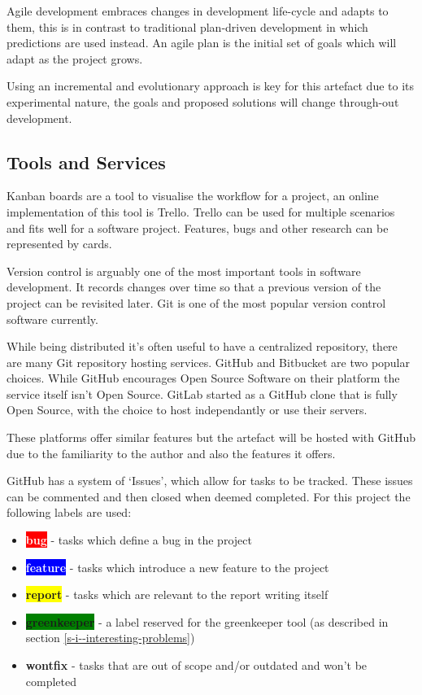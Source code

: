 Agile development embraces changes in development life-cycle and adapts to them, this is in contrast to traditional plan-driven development in which predictions are used instead. An agile plan is the initial set of goals which will adapt as the project grows. \cite{fowler_agile}

Using an incremental and evolutionary approach is key for this artefact due to its experimental nature, the goals and proposed solutions will change through-out development.

\subsection{Tools and Services} \label{a-d--methodology--tools}

Kanban boards are a tool to visualise the workflow for a project, an online implementation of this tool is Trello. Trello can be used for multiple scenarios and fits well for a software project. Features, bugs and other research can be represented by cards. \cite{trello} %

Version control is arguably one of the most important tools in software development. It records changes over time so that a previous version of the project can be revisited later. Git is one of the most popular version control software currently. \cite{git}

While being distributed it's often useful to have a centralized repository, there are many Git repository hosting services. GitHub and Bitbucket are two popular choices. While GitHub encourages Open Source Software on their platform the service itself isn't Open Source. \cite{github} GitLab started as a GitHub clone that is fully Open Source, with the choice to host independantly or use their servers. \cite{gitlab} \cite{bitbucket}

These platforms offer similar features but the artefact will be hosted with GitHub due to the familiarity to the author and also the features it offers.

GitHub has a system of `Issues', which allow for tasks to be tracked. These issues can be commented and then closed when deemed completed. For this project the following labels are used:

\begin{itemize}
  \item \textbf{\colorbox{red}{\textcolor{white}{bug}}} - tasks which define a bug in the project
  \item \textbf{\colorbox{blue}{\textcolor{white}{feature}}} -  tasks which introduce a new feature to the project
  \item \textbf{\colorbox{yellow}{report}} - tasks which are relevant to the report writing itself
  \item \textbf{\colorbox{green}{greenkeeper}} - a label reserved for the greenkeeper tool (as described in section \ref{s-i--interesting-problems})
  \item \textbf{wontfix} - tasks that are out of scope and/or outdated and won't be completed
\end{itemize}

